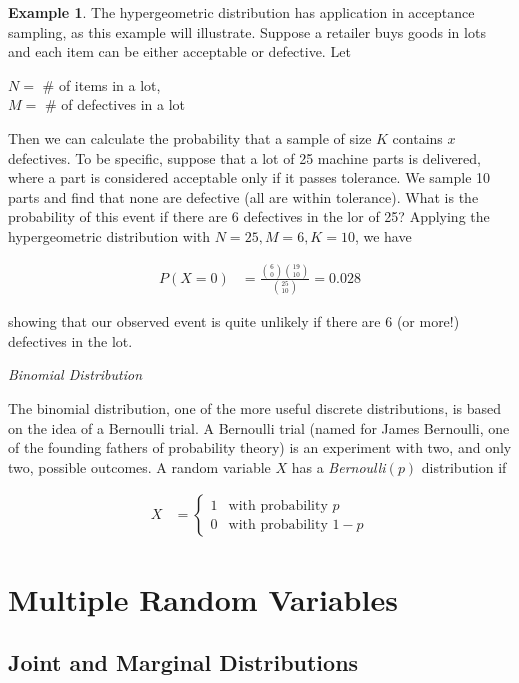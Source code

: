 \documentclass[11pt,a4paper]{report}
\theoremstyle{definition}
\theoremstyle{theorem}
\theoremstyle{example}
\newtheorem{ex}{Example}[section]
\begin{document}
\begin{ex}
  The hypergeometric distribution has application in acceptance sampling, as this example will illustrate.  Suppose a retailer buys goods in lots and each item can be either acceptable or defective.  Let
  \begin{center}
    $N = $ # of items in a lot, \\
    $M = $ # of defectives in a lot
  \end{center}

Then we can calculate the probability that a sample of size $K$ contains $x$ defectives.  To be specific, suppose that a lot of 25 machine parts is delivered, where a part is considered acceptable only if it passes tolerance.  We sample 10 parts and find that none are defective (all are within tolerance).  What is the probability of this event if there are 6 defectives in the lor of 25?  Applying the hypergeometric distribution with $N=25, M=6, K=10$, we have

\begin{align*}
  P(X=0) &= \frac{{6 \choose 0}{19 \choose 10}}{{25 \choose 10}} = 0.028
\end{align*}

showing that our observed event is quite unlikely if there are 6 (or more!) defectives in the lot.
\end{ex}

\textit{Binomial Distribution}

The binomial distribution, one of the more useful discrete distributions, is based on the idea of a Bernoulli trial.  A Bernoulli trial (named for James Bernoulli, one of the founding fathers of probability theory) is an experiment with two, and only two, possible outcomes.  A random variable $X$ has a \textit{Bernoulli}$(p)$ distribution if

\begin{align*}
  X &= 
  \begin{cases} 
    1 & \text{with probability } p \\
    0 & \text{with probability } 1-p
  \end{cases}
\end{align*}


\chapter{Multiple Random Variables}

\section{Joint and Marginal Distributions}
\end{document}
